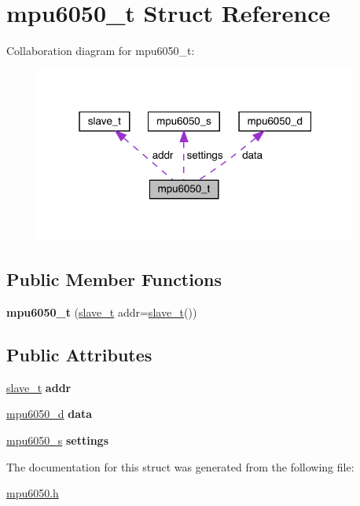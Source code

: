 \hypertarget{structmpu6050__t}{}\section{mpu6050\+\_\+t Struct Reference}
\label{structmpu6050__t}


Collaboration diagram for mpu6050\+\_\+t\+:\nopagebreak
\begin{figure}[H]
\begin{center}
\leavevmode
\includegraphics[width=301pt]{structmpu6050__t__coll__graph}
\end{center}
\end{figure}
\subsection*{Public Member Functions}
\begin{DoxyCompactItemize}
\item 
\mbox{\label{structmpu6050__t_ae66ee931655d40f389f45fa2bd652dbf}} 
{\bfseries mpu6050\+\_\+t} (\hyperlink{structslave__t}{slave\+\_\+t} addr=\hyperlink{structslave__t}{slave\+\_\+t}())
\end{DoxyCompactItemize}
\subsection*{Public Attributes}
\begin{DoxyCompactItemize}
\item 
\mbox{\label{structmpu6050__t_a61f3fb7626fd4df7fe919da15b61f400}} 
\hyperlink{structslave__t}{slave\+\_\+t} {\bfseries addr}
\item 
\mbox{\label{structmpu6050__t_ad9d6c6a1e71d62ebffdbf123aafe009e}} 
\hyperlink{structmpu6050__d}{mpu6050\+\_\+d} {\bfseries data}
\item 
\mbox{\label{structmpu6050__t_a185513b1c965c430645d75eecf5a401d}} 
\hyperlink{structmpu6050__s}{mpu6050\+\_\+s} {\bfseries settings}
\end{DoxyCompactItemize}


The documentation for this struct was generated from the following file\+:\begin{DoxyCompactItemize}
\item 
\hyperlink{mpu6050_8h}{mpu6050.\+h}\end{DoxyCompactItemize}
